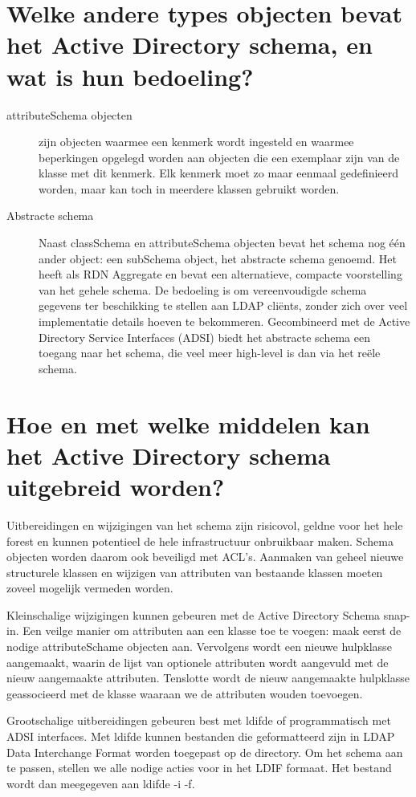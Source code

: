 \section{Welke andere types objecten bevat het Active Directory schema, en wat
is hun bedoeling?}

\begin{description}
	\item[attributeSchema objecten] zijn objecten waarmee een kenmerk wordt
		ingesteld en waarmee beperkingen opgelegd worden aan objecten
		die een exemplaar zijn van de klasse met dit kenmerk. Elk
		kenmerk moet zo maar eenmaal gedefinieerd worden, maar kan toch
		in meerdere klassen gebruikt worden.
	\item[Abstracte schema] Naast classSchema en attributeSchema
		objecten bevat het schema nog één ander object: een subSchema
		object, het abstracte schema genoemd. Het heeft als RDN
		Aggregate en bevat een alternatieve, compacte voorstelling van
		het gehele schema. De bedoeling is om vereenvoudigde schema
		gegevens ter beschikking te stellen aan LDAP cliënts, zonder
		zich over veel implementatie details hoeven te bekommeren.
		Gecombineerd met de Active Directory Service Interfaces (ADSI)
		biedt het abstracte schema een toegang naar het schema, die veel
		meer high-level is dan via het reële schema.
\end{description}

\section{Hoe en met welke middelen kan het Active Directory schema uitgebreid
worden?}

Uitbereidingen en wijzigingen van het schema zijn risicovol, geldne voor het
hele forest en kunnen potentieel de hele infrastructuur onbruikbaar maken.
Schema objecten worden daarom ook beveiligd met ACL's. Aanmaken van geheel
nieuwe structurele klassen en wijzigen van attributen van bestaande klassen
moeten zoveel mogelijk vermeden worden.

Kleinschalige wijzigingen kunnen gebeuren met de Active Directory Schema
snap-in. Een veilge manier om attributen aan een klasse toe te voegen: maak
eerst de nodige attributeSchame objecten aan. Vervolgens wordt een nieuwe
hulpklasse aangemaakt, waarin de lijst van optionele attributen wordt aangevuld
met de nieuw aangemaakte attributen. Tenslotte wordt de nieuw aangemaakte
hulpklasse geassocieerd met de klasse waaraan we de attributen wouden toevoegen.

Grootschalige uitbereidingen gebeuren best met ldifde of programmatisch met ADSI
interfaces. Met ldifde kunnen bestanden die geformatteerd zijn in LDAP Data
Interchange Format worden toegepast op de directory. Om het schema aan te
passen, stellen we alle nodige acties voor in het LDIF formaat. Het bestand
wordt dan meegegeven aan ldifde -i -f.
